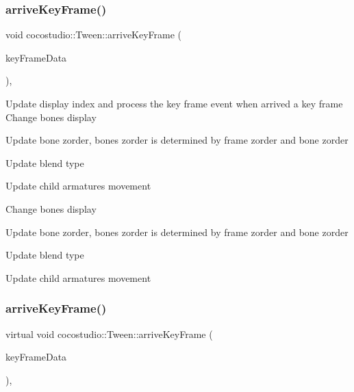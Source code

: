 \subsubsection{\texorpdfstring{arrive\+Key\+Frame()}{arriveKeyFrame()}\hspace{0.1cm}{\footnotesize\ttfamily [1/2]}}
{\footnotesize\ttfamily void cocostudio\+::\+Tween\+::arrive\+Key\+Frame (\begin{DoxyParamCaption}\item[{\hyperlink{classcocostudio_1_1FrameData}{Frame\+Data} $\ast$}]{key\+Frame\+Data }\end{DoxyParamCaption})\hspace{0.3cm}{\ttfamily [protected]}, {\ttfamily [virtual]}}

Update display index and process the key frame event when arrived a key frame Change bone\textquotesingle{}s display

Update bone zorder, bone\textquotesingle{}s zorder is determined by frame zorder and bone zorder

Update blend type

Update child armature\textquotesingle{}s movement

Change bone\textquotesingle{}s display

Update bone zorder, bone\textquotesingle{}s zorder is determined by frame zorder and bone zorder

Update blend type

Update child armature\textquotesingle{}s movement \mbox{\label{classcocostudio_1_1Tween_a71d3c53c1cd83747807916a13e9d9b4c}} 
\subsubsection{\texorpdfstring{arrive\+Key\+Frame()}{arriveKeyFrame()}\hspace{0.1cm}{\footnotesize\ttfamily [2/2]}}
{\footnotesize\ttfamily virtual void cocostudio\+::\+Tween\+::arrive\+Key\+Frame (\begin{DoxyParamCaption}\item[{\hyperlink{classcocostudio_1_1FrameData}{Frame\+Data} $\ast$}]{key\+Frame\+Data }\end{DoxyParamCaption})\hspace{0.3cm}{\ttfamily [protected]}, {\ttfamily [virtual]}}

